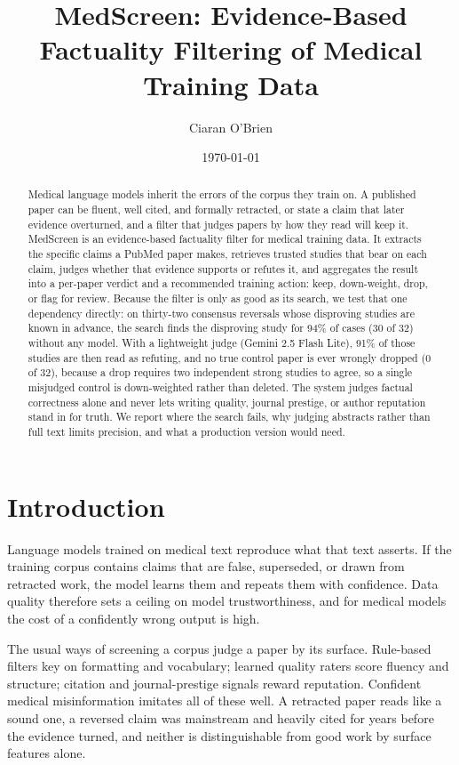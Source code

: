 \documentclass[11pt,a4paper]{article}
\title{MedScreen: Evidence-Based Factuality Filtering of Medical Training Data}
\author{Ciaran O'Brien}
\date{\today}
\begin{document}
\maketitle

\begin{abstract}

Medical language models inherit the errors of the corpus they train on. A published paper can be fluent, well cited, and formally retracted, or state a claim that later evidence overturned, and a filter that judges papers by how they read will keep it. MedScreen is an evidence-based factuality filter for medical training data. It extracts the specific claims a PubMed paper makes, retrieves trusted studies that bear on each claim, judges whether that evidence supports or refutes it, and aggregates the result into a per-paper verdict and a recommended training action: keep, down-weight, drop, or flag for review. Because the filter is only as good as its search, we test that one dependency directly: on thirty-two consensus reversals whose disproving studies are known in advance, the search finds the disproving study for 94\% of cases (30 of 32) without any model. With a lightweight judge (Gemini 2.5 Flash Lite), 91\% of those studies are then read as refuting, and no true control paper is ever wrongly dropped (0 of 32), because a drop requires two independent strong studies to agree, so a single misjudged control is down-weighted rather than deleted. The system judges factual correctness alone and never lets writing quality, journal prestige, or author reputation stand in for truth. We report where the search fails, why judging abstracts rather than full text limits precision, and what a production version would need.

\end{abstract}

\section{Introduction}

Language models trained on medical text reproduce what that text asserts. If the training corpus contains claims that are false, superseded, or drawn from retracted work, the model learns them and repeats them with confidence. Data quality therefore sets a ceiling on model trustworthiness, and for medical models the cost of a confidently wrong output is high.

The usual ways of screening a corpus judge a paper by its surface. Rule-based filters key on formatting and vocabulary; learned quality raters score fluency and structure; citation and journal-prestige signals reward reputation. Confident medical misinformation imitates all of these well. A retracted paper reads like a sound one, a reversed claim was mainstream and heavily cited for years before the evidence turned, and neither is distinguishable from good work by surface features alone.
\end{document}
